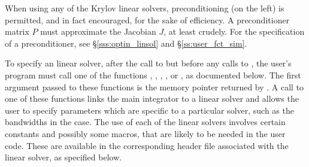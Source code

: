 When using any of the Krylov linear solvers, preconditioning (on the left)
is permitted, and in fact encouraged, for the sake of efficiency.
A preconditioner matrix $P$ must approximate the Jacobian $J$, at least
crudely.  For the specification of a preconditioner, see \S\ref{sss:optin_linsol}
and \S\ref{ss:user_fct_sim}.

To specify an {\ida} linear solver, after the call to  but
before any calls to , the user's program must call one of the
functions , , , , or
, as documented below. The first argument passed to these functions
is the {\ida} memory pointer returned by .  A call to one of these
functions links the main {\ida} integrator to a linear solver and
allows the user to specify parameters which are specific to a
particular solver, such as the bandwidths in the {\idaband} case.
The use of each of the linear solvers involves certain constants and possibly 
some macros, that are likely to be needed in the user code.  These are
available in the corresponding header file associated with the linear
solver, as specified below.

